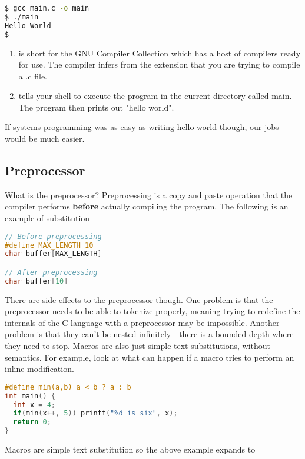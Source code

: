 \begin{lstlisting}[language=bash]
$ gcc main.c -o main
$ ./main
Hello World
$
\end{lstlisting}

\begin{enumerate}
\item {} is short for the \gls{GNU Compiler Collection} which has a host of compilers ready for use.
  The compiler infers from the extension that you are trying to compile a .c file.
\item {} tells your shell to execute the program in the current directory called main.
  The program then prints out "hello world".
\end{enumerate}

If systems programming was as easy as writing hello world though, our jobs would be much easier.

\subsection{Preprocessor}

What is the \gls{preprocessor}?
Preprocessing is a copy and paste operation that the compiler performs \textbf{before} actually compiling the program.
The following is an example of substitution

\begin{lstlisting}[language=C]
// Before preprocessing
#define MAX_LENGTH 10
char buffer[MAX_LENGTH]

// After preprocessing
char buffer[10]
\end{lstlisting}

There are side effects to the preprocessor though.
One problem is that the preprocessor needs to be able to \gls{tokenize} properly, meaning trying to redefine the internals of the C language with a preprocessor may be impossible.
Another problem is that they can't be \gls{nested} infinitely - there is a bounded depth where they need to stop.
Macros are also just simple text substitutions, without semantics.
For example, look at what can happen if a macro tries to perform an inline modification.

\begin{lstlisting}[language=C]
#define min(a,b) a < b ? a : b
int main() {
  int x = 4;
  if(min(x++, 5)) printf("%d is six", x);
  return 0;
}
\end{lstlisting}

Macros are simple text substitution so the above example expands to

